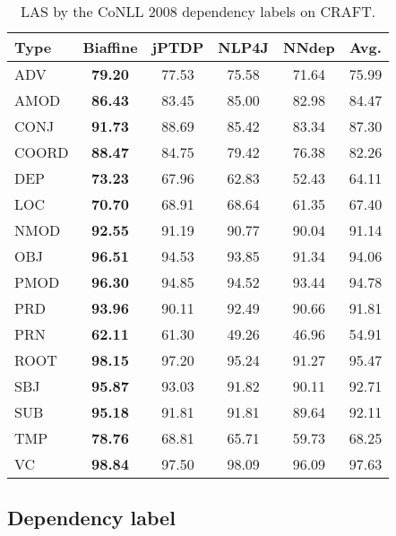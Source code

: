 \documentclass[twocolumn,hyperref]{bmcart}\pdfoutput=1
\begin{document}
\begin{table}[!t]
\caption{LAS  by the CoNLL 2008 dependency labels on CRAFT. }
\centering
\begin{tabular}{l|c|c|c|c|c }
\hline
Type & Biaffine	& jPTDP	& NLP4J	& NNdep & Avg. \\
\hline
ADV		 & \textbf{79.20}		 & 77.53	 & 	75.58	 & 	71.64 & 75.99 \\
AMOD	 & 	\textbf{86.43}	 & 	83.45	 & 	85.00	 & 	82.98 &84.47  \\
CONJ		 & \textbf{91.73}		 & 88.69		 & 85.42		 & 83.34 &  87.30\\
COORD		 & \textbf{88.47}	 & 	84.75	 & 	79.42		 & 76.38  &82.26 \\
DEP		 & \textbf{73.23}		 & 67.96		 & 62.83		 & 52.43 & 64.11 \\
LOC		 & \textbf{70.70}		 & 68.91	 & 	68.64		 & 61.35 & 67.40 \\
NMOD		 & \textbf{92.55}	 & 	91.19	 & 	90.77	 & 	90.04 &  91.14\\
OBJ		 & \textbf{96.51}	 & 	94.53		 & 93.85		 & 91.34 &  94.06\\
PMOD		 & \textbf{96.30}		 & 94.85	 & 	94.52		 & 93.44 &94.78  \\
PRD		 & \textbf{93.96}	 & 	90.11		 & 92.49		 & 90.66 & 91.81 \\
PRN	 & 	\textbf{62.11	}	 & 61.30		 & 49.26	 & 	46.96 &  54.91\\
ROOT		 & \textbf{98.15}		 & 97.20		 & 95.24		 & 91.27 & 95.47 \\
SBJ		 & \textbf{95.87}		 & 93.03	 & 	91.82	 & 	90.11 & 92.71 \\
SUB		 & \textbf{95.18}	 & 	91.81	 & 	91.81	 & 	89.64 &  92.11\\
TMP		 & \textbf{78.76}	 & 	68.81	 & 	65.71		 & 59.73 &68.25 \\
VC		 & \textbf{98.84}		 & 97.50		 & 98.09		 & 96.09 & 97.63 \\
\hline
\end{tabular}
\label{tab:LAS_CRAFT_DepTypes}
\end{table}

\subsection*{Dependency label}
\end{document}
